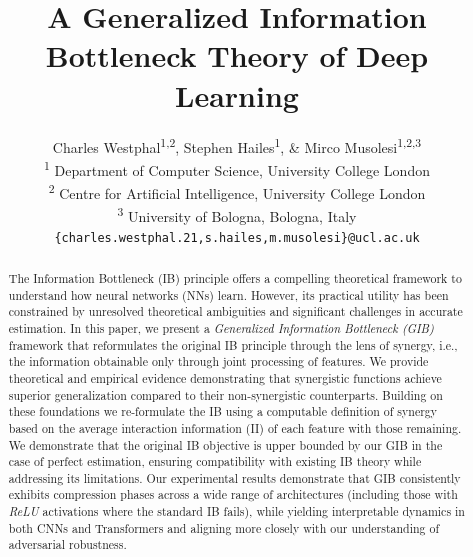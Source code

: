 \documentclass{article}
\title{A Generalized Information Bottleneck Theory of Deep Learning}
\author{
    Charles Westphal\textsuperscript{1,2}, Stephen Hailes\textsuperscript{1}, \& Mirco Musolesi\textsuperscript{1,2,3} \\
    \textsuperscript{1} Department of Computer Science, University College London \\
    \textsuperscript{2} Centre for Artificial Intelligence, University College London\\ \textsuperscript{3} University of Bologna, Bologna, Italy \\
    \texttt{\{charles.westphal.21,s.hailes,m.musolesi\}@ucl.ac.uk} 
}
\theoremstyle{definition}
\theoremstyle{remark}
\begin{document}
\maketitle

\begin{abstract}
The Information Bottleneck (IB) principle offers a compelling theoretical framework to understand how neural networks (NNs) learn. However, its practical utility has been constrained by unresolved theoretical ambiguities and significant challenges in accurate estimation.
In this paper, we present a \textit{Generalized Information Bottleneck (GIB)} framework that reformulates the original IB principle through the lens of synergy, i.e., the information obtainable only through joint processing of features. We provide theoretical and empirical evidence demonstrating that synergistic functions achieve superior generalization compared to their non-synergistic counterparts. Building on these foundations we re-formulate the IB using a computable definition of synergy based on the average interaction information (II) of each feature with those remaining. We demonstrate that the original IB objective is upper bounded by our GIB in the case of perfect estimation, ensuring compatibility with existing IB theory while addressing its limitations. 
Our experimental results demonstrate that GIB consistently exhibits compression phases across a wide range of architectures (including those with \textit{ReLU} activations where the standard IB fails), while yielding interpretable dynamics in both CNNs and Transformers and aligning more closely with our understanding of adversarial robustness.
\end{abstract}
\end{document}
